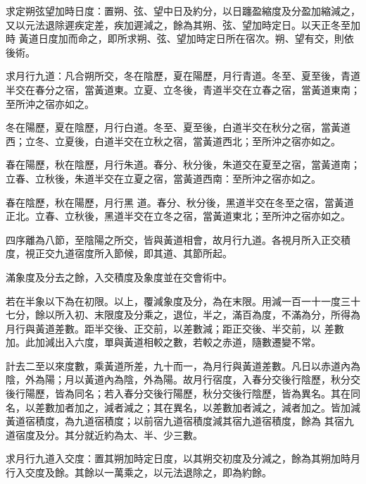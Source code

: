 \begin{pinyinscope}
 求定朔弦望加時日度：置朔、弦、望中日及約分，以日躔盈縮度及分盈加縮減之，又以元法退除遲疾定差，疾加遲減之，餘為其朔、弦、望加時定日。以天正冬至加時
 黃道日度加而命之，即所求朔、弦、望加時定日所在宿次。朔、望有交，則依後術。



 求月行九道：凡合朔所交，冬在陰歷，夏在陽歷，月行青道。冬至、夏至後，青道半交在春分之宿，當黃道東。立夏、立冬後，青道半交在立春之宿，當黃道東南；至所沖之宿亦如之。



 冬在陽歷，夏在陰歷，月行白道。冬至、夏至後，白道半交在秋分之宿，當黃道西；立冬、立夏後，白道半交在立秋之宿，當黃道西北；至所沖之宿亦如之。



 春在陽歷，秋在陰歷，月行朱道。春分、秋分後，朱道交在夏至之宿，當黃道南；立春、立秋後，朱道半交在立夏之宿，當黃道西南：至所沖之宿亦如之。



 春在陰歷，秋在陽歷，月行黑
 道。春分、秋分後，黑道半交在冬至之宿，當黃道正北。立春、立秋後，黑道半交在立冬之宿，當黃道東北；至所沖之宿亦如之。



 四序離為八節，至陰陽之所交，皆與黃道相會，故月行九道。各視月所入正交積度，視正交九道宿度所入節候，即其道、其節所起。



 滿象度及分去之餘，入交積度及象度並在交會術中。



 若在半象以下為在初限。以上，覆減象度及分，為在末限。用減一百一十一度三十七分，餘以所入初、末限度及分乘之，退位，半之，滿百為度，不滿為分，所得為月行與黃道差數。距半交後、正交前，以差數減；距正交後、半交前，以
 差數加。此加減出入六度，單與黃道相較之數，若較之赤道，隨數遷變不常。



 計去二至以來度數，乘黃道所差，九十而一，為月行與黃道差數。凡日以赤道內為陰，外為陽；月以黃道內為陰，外為陽。故月行宿度，入春分交後行陰歷，秋分交後行陽歷，皆為同名；若入春分交後行陽歷，秋分交後行陰歷，皆為異名。其在同名，以差數加者加之，減者減之；其在異名，以差數加者減之，減者加之。皆加減黃道宿積度，為九道宿積度；以前宿九道宿積度減其宿九道宿積度，餘為
 其宿九道宿度及分。其分就近約為太、半、少三數。



 求月行九道入交度：置其朔加時定日度，以其朔交初度及分減之，餘為其朔加時月行入交度及餘。其餘以一萬乘之，以元法退除之，即為約餘。




\end{pinyinscope}
